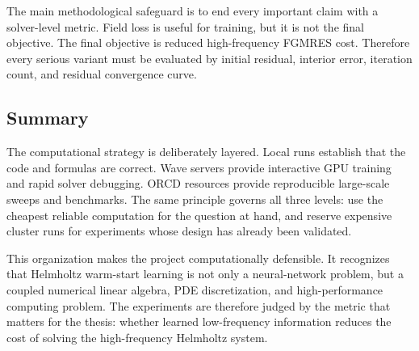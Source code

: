 The main methodological safeguard is to end every important claim with a
solver-level metric. Field loss is useful for training, but it is not the
final objective. The final objective is reduced high-frequency FGMRES cost.
Therefore every serious variant must be evaluated by initial residual,
interior error, iteration count, and residual convergence curve.


\subsection{Summary}
\label{subsec:computational_summary}

The computational strategy is deliberately layered. Local runs establish that
the code and formulas are correct. Wave servers provide interactive GPU
training and rapid solver debugging. ORCD resources provide reproducible
large-scale sweeps and benchmarks. The same principle governs all three
levels: use the cheapest reliable computation for the question at hand, and
reserve expensive cluster runs for experiments whose design has already been
validated.

This organization makes the project computationally defensible. It recognizes
that Helmholtz warm-start learning is not only a neural-network problem, but a
coupled numerical linear algebra, PDE discretization, and high-performance
computing problem. The experiments are therefore judged by the metric that
matters for the thesis: whether learned low-frequency information reduces the
cost of solving the high-frequency Helmholtz system.


